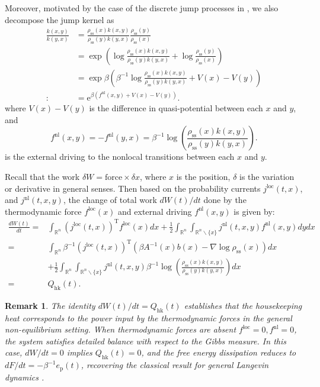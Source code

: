 \documentclass[10pt]{article}
\newtheorem{remark}{Remark}[section]
\theoremstyle{definition}
\numberwithin{equation}{section}
\begin{document}
Moreover, motivated by the case of the discrete jump processes in \cite{MNW08}, we also decompose the jump kernel as
\begin{align*}
    \frac{k(x,y)}{k(y,x)}
    &= \frac{\rho_\mathrm{ss}(x)k(x,y)}{\rho_\mathrm{ss}(y)k(y,x)} \frac{\rho_\mathrm{ss}(y)}{\rho_\mathrm{ss}(x)}\\
    &= \exp\left( \log \frac{\rho_\mathrm{ss}(x)k(x,y)}{\rho_\mathrm{ss}(y)k(y,x)} + \log \frac{\rho_\mathrm{ss}(y)}{\rho_\mathrm{ss}(x)} \right)\\
    &= \exp\beta\left( \beta^{-1}\log \frac{\rho_\mathrm{ss}(x)k(x,y)}{\rho_\mathrm{ss}(y)k(y,x)} + V(x)-V(y) \right)\\
    :&= \mathrm{e}^{\beta(f^\mathrm{nl}(x,y) + V(x)-V(y))}.
\end{align*}
where $V(x) - V(y)$ is the difference in quasi-potential between each $x$ and $y$, and
\begin{equation}
    f^\mathrm{nl}(x,y) = -f^\mathrm{nl}(y,x) = \beta^{-1}\log \left(\frac{\rho_\mathrm{ss}(x)k(x,y)}{\rho_\mathrm{ss}(y)k(y,x)} \right).
\end{equation}
is the external driving to the nonlocal transitions between each $x$ and $y$. 

Recall that the work $\delta W = \text{force} \times \delta x$, where $x$ is the position, $\delta$ is the variation or derivative in general senses. Then based on the probability currents $j^\mathrm{loc}(t,x)$, and $j^\mathrm{nl}(t,x,y)$, the change of total work $dW(t)/dt$ done by the thermodynamic force $f^\mathrm{loc}(x)$ and external driving $f^{\text{nl}}(x,y)$ is given by:
\begin{align*}
    \frac{dW(t)}{dt}
    =& \int_{\mathbb{R}^{n}} (j^\mathrm{loc}(t,x))^\mathrm{T} f^\mathrm{loc}(x) dx + \frac{1}{2} \int_{\mathbb{R}^{n}} \int_{\mathbb{R}^{n} \backslash \{x\}} j^\mathrm{nl}(t,x,y) f^\mathrm{nl}(x,y) dydx\\
    =& \int_{\mathbb{R}^{n}} \beta^{-1}(j^\mathrm{loc}(t,x))^\mathrm{T}( \beta A^{-1}(x)b(x) - \nabla\log\rho_\mathrm{ss}(x) )dx\\
    &+ \frac{1}{2}\int_{\mathbb{R}^{n}} \int_{\mathbb{R}^{n} \backslash \{x\}} j^\mathrm{nl}(t,x,y) \beta^{-1}\log \left(\frac{\rho_\mathrm{ss}(x)k(x,y)}{\rho_\mathrm{ss}(y)k(y,x)} \right)dx\\
    =& Q_\mathrm{hk}(t).
\end{align*}
\begin{remark}
   The identity $dW(t)/dt = Q_\mathrm{hk}(t)$ establishes that the housekeeping heat corresponds to the power input by the thermodynamic forces in the general non-equilibrium setting. When thermodynamic forces are absent $f^\mathrm{loc} = 0,  f^\mathrm{nl} = 0$, the system satisfies detailed balance with respect to the Gibbs measure. In this case, $dW/dt = 0$ implies $Q_\mathrm{hk}(t) = 0$, and the free energy dissipation reduces to $dF/dt = -\beta^{-1} e_\mathrm{p}(t)$, recovering the classical result for general Langevin dynamics \cite{ZL25}.
\end{remark}
\end{document}
